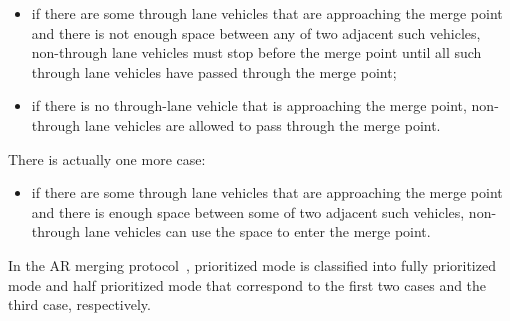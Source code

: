 \documentclass[10pt, conference, compsocconf]{IEEEtran}
\begin{document}
\begin{itemize}
\item if there are some through lane vehicles that are approaching the
  merge point and there is not enough space between any of two adjacent
  such vehicles, non-through lane vehicles must stop before the merge
  point until all such through lane vehicles have passed through the
  merge point;

\item if there is no through-lane vehicle that is approaching the
  merge point, non-through lane vehicles are allowed to pass through
  the merge point.
\end{itemize}

\noindent
There is actually one more case:

\begin{itemize}
\item if there are some through lane vehicles that are approaching the
  merge point and there is enough space between some of two adjacent
  such vehicles, non-through lane vehicles can use the space to enter
  the merge point.
\end{itemize}

\noindent
In the AR merging protocol~\cite{10.1145/3055004.3055028}, prioritized
mode is classified into fully prioritized mode and half prioritized
mode that correspond to the first two cases and the third case,
respectively. 



%
%
\end{document}
